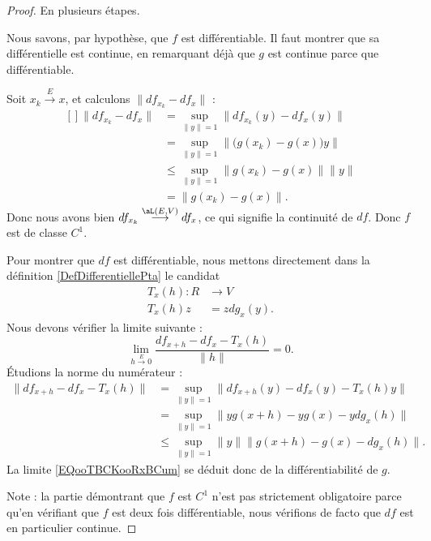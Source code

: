 \begin{proof}
	En plusieurs étapes.
	\begin{subproof}
		\spitem[\( f\) est \( C^1\)]
		Nous savons, par hypothèse, que \( f\) est différentiable. Il faut montrer que sa différentielle est continue, en remarquant déjà que \( g\) est continue parce que différentiable.

		Soit \( x_k\stackrel{E}{\longrightarrow}x\), et calculons \( \| df_{x_k}-df_x \|\) :
		\begin{equation}
			\begin{aligned}[]
				\| df_{x_k}-df_x \| & =\sup_{\| y \|=1}\| df_{x_k}(y)-df_x(y) \|    \\
				                    & =\sup_{\| y \|=1}\| \big(g(x_k)-g(x)\big)y \| \\
				                    & \leq\sup_{\| y \|=1}\| g(x_k)-g(x) \|\| y \|  \\
				                    & =\| g(x_k)-g(x) \|.
			\end{aligned}
		\end{equation}
		Donc nous avons bien \(df_{x_k}\stackrel{\aL(E,V)}{\longrightarrow}df_x\), ce qui signifie la continuité de \( df\). Donc \( f\) est de classe \( C^1\).


		Pour montrer que \( df\) est différentiable, nous mettons directement dans la définition \eqref{DefDifferentiellePta} le candidat
		\begin{equation}
			\begin{aligned}
				T_x(h)\colon R & \to V      \\
				T_x(h)z        & =zdg_x(y).
			\end{aligned}
		\end{equation}
		Nous devons vérifier la limite suivante :
		\begin{equation}        \label{EQooTBCKooRxBCum}
			\lim_{h\stackrel{E}{\longrightarrow} 0} \frac{ df_{x+h}-df_x-T_x(h) }{ \| h \| }=0.
		\end{equation}
		Étudions la norme du numérateur :
		\begin{subequations}
			\begin{align}
				\| df_{x+h}-df_x-T_x(h) \| & =\sup_{\| y \|=1}\| df_{x+h}(y)-df_x(y)-T_x(h)y \|      \\
				                           & =\sup_{\| y \|=1}\| yg(x+h)-yg(x)-ydg_x(h) \|           \\
				                           & \leq \sup_{\| y \|=1}\| y \| \| g(x+h)-g(x)-dg_x(h) \|.
			\end{align}
		\end{subequations}
		La limite \eqref{EQooTBCKooRxBCum} se déduit donc de la différentiabilité de \( g\).
	\end{subproof}
	Note : la partie démontrant que \( f\) est \( C^1\) n'est pas strictement obligatoire parce qu'en vérifiant que \( f\) est deux fois différentiable, nous vérifions de facto que \( df\) est en particulier continue.
\end{proof}

